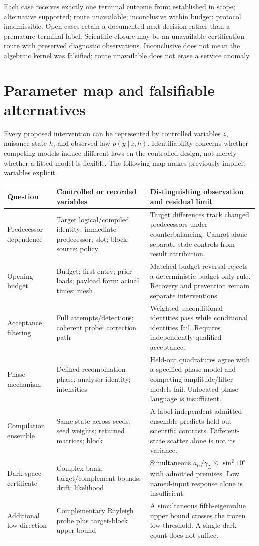 \documentclass[11pt,a4paper]{article}
\begin{document}
Each case receives exactly one terminal outcome from: established in scope; alternative supported; route unavailable; inconclusive within budget; protocol inadmissible. Open cases retain a documented next decision rather than a premature terminal label. Scientific closure may be an unavailable certification route with preserved diagnostic observations. Inconclusive does not mean the algebraic kernel was falsified; route unavailable does not erase a service anomaly.


\section{Parameter map and falsifiable alternatives}
Every proposed intervention can be represented by controlled variables $z$, nuisance state $h$, and observed law $p(y\mid z,h)$. Identifiability concerns whether competing models induce different laws on the controlled design, not merely whether a fitted model is flexible. The following map makes previously implicit variables explicit.
\begin{longtable}{p{}p{}p{}}
\toprule
Question & Controlled or recorded variables & Distinguishing observation and residual limit\\\midrule
\endhead
Predecessor dependence & Target logical/compiled identity; immediate predecessor; slot; block; source; policy & Target differences track changed predecessors under counterbalancing. Cannot alone separate stale controls from result attribution.\\
Opening budget & Budget; first entry; prior loads; payload form; actual times; mesh & Matched budget reversal rejects a deterministic budget-only rule. Recovery and prevention remain separate interventions.\\
Acceptance filtering & Full attempts/detections; coherent probe; correction path & Weighted unconditional identities pass while conditional identities fail. Requires independently qualified acceptance.\\
Phase mechanism & Defined recombination phase; analyser identity; intensities & Held-out quadratures agree with a specified phase model and competing amplitude/filter models fail. Unlocated phase language is insufficient.\\
Compilation ensemble & Same state across seeds; seed weights; returned matrices; block & A label-independent admitted ensemble predicts held-out scientific contrasts. Different-state scatter alone is not its variance.\\
Dark-space certificate & Complex bank; target/complement bounds; drift; likelihood & Simultaneous $a_U/\gamma_L\le\sin^2 10^\circ$ with admitted premises. Low named-input response alone is insufficient.\\
Additional low direction & Complementary Rayleigh probe plus target-block upper bound & A simultaneous fifth-eigenvalue upper bound crosses the frozen low threshold. A single dark count does not suffice.\\
\bottomrule
\end{longtable}
\end{document}
